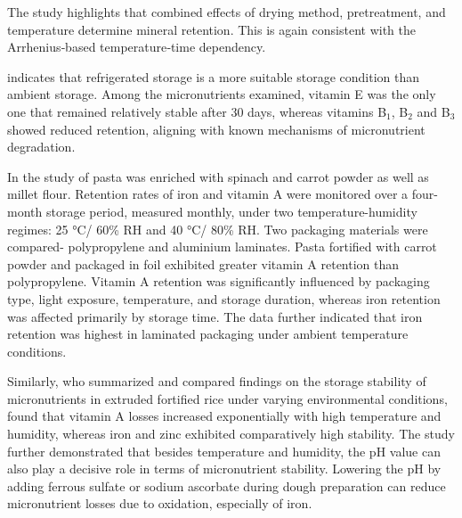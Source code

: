 The study highlights that combined effects of drying method, pretreatment, and temperature determine mineral retention. This is again consistent with the Arrhenius‑based temperature‑time dependency.

 \par 
\citet{cookie} indicates that refrigerated storage is a more suitable storage condition than ambient storage. Among the micronutrients examined, vitamin E was the only one that remained relatively stable after 30 days, whereas vitamins B$_1$, B$_2$ and B$_3$ showed reduced retention, aligning with known mechanisms of micronutrient degradation.




In the study of \citet{sharma} pasta was enriched with spinach and carrot powder as well as millet flour. Retention rates of iron and vitamin A were monitored over a four-month storage period, measured monthly, under two temperature-humidity regimes:  25 °C/ 60\% RH and 40 °C/ 80\% RH. Two packaging materials were compared- polypropylene and aluminium laminates.
Pasta fortified with carrot powder and packaged in foil exhibited greater vitamin A retention than polypropylene. Vitamin A retention was significantly influenced by packaging type, light exposure, temperature, and storage duration,  whereas iron retention was affected primarily by storage time. The data further indicated that iron retention was highest in laminated packaging under ambient temperature conditions.
\par 
Similarly, \citet{saha} who summarized and compared findings on the storage stability of micronutrients in extruded fortified rice under varying environmental conditions, found that vitamin A losses increased exponentially with high temperature and humidity, whereas iron and zinc exhibited comparatively high stability. The study further demonstrated that besides temperature and humidity, the pH value can also play a decisive role in terms of micronutrient stability. Lowering the pH by adding ferrous sulfate or sodium ascorbate during dough preparation can reduce micronutrient losses due to oxidation, especially of iron.


